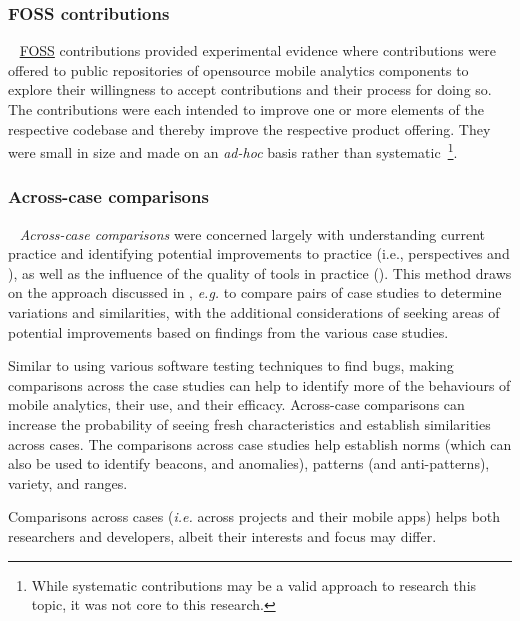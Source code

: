 \subsubsection{FOSS contributions}~\label{foss-contributions-research-methods}
\href{glossary-FOSS}{FOSS} contributions provided experimental evidence where contributions were offered to public repositories of opensource mobile analytics components to explore their willingness to accept contributions and their process for doing so. The contributions were each intended to improve one or more elements of the respective codebase and thereby improve the respective product offering. They were small in size and made on an \emph{ad-hoc} basis rather than systematic~\footnote{While systematic contributions may be a valid approach to research this topic, it was not core to this research.}.


\subsubsection{Across-case comparisons}~\label{across-case-comparisons-research-method}
\textit{Across-case comparisons} were concerned largely with understanding current practice and identifying potential improvements to practice (i.e., perspectives \uuse and \iuse), as well as the influence of the quality of tools in practice (\itools). This method draws on the approach discussed in \citet[pp. 567-569]{seaman1999_qualitative_methods_in_esse}, \textit{e.g.} to compare pairs of case studies to determine variations and similarities, with the additional considerations of seeking areas of potential improvements based on findings from the various case studies.

Similar to using various software testing techniques to find bugs, making comparisons across the case studies can help to identify more of the behaviours of mobile analytics, their use, and their efficacy. Across-case comparisons can increase the probability of seeing fresh characteristics and establish similarities across cases. The comparisons across case studies help establish norms (which can also be used to identify beacons, and anomalies), patterns (and anti-patterns), variety, and ranges. 

Comparisons across cases (\textit{i.e.} across projects and their mobile apps) helps both researchers and developers, albeit their interests and focus may differ.


